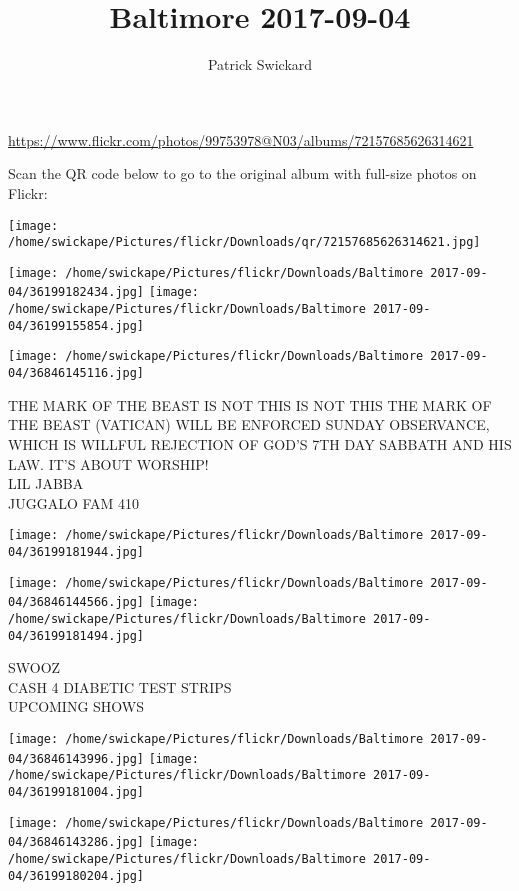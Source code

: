 \documentclass[10pt,letterpaper]{article}
\title{Baltimore 2017-09-04}
\author{Patrick Swickard}
\date{}
\begin{document}
\maketitle

\url{https://www.flickr.com/photos/99753978@N03/albums/72157685626314621}

Scan the QR code below to go to the original album with full-size photos on Flickr:

\texttt{[image: /home/swickape/Pictures/flickr/Downloads/qr/72157685626314621.jpg]}
\pagebreak

\texttt{[image: /home/swickape/Pictures/flickr/Downloads/Baltimore 2017-09-04/36199182434.jpg]}
\texttt{[image: /home/swickape/Pictures/flickr/Downloads/Baltimore 2017-09-04/36199155854.jpg]}

\vspace{0.25in}
\texttt{[image: /home/swickape/Pictures/flickr/Downloads/Baltimore 2017-09-04/36846145116.jpg]}

THE MARK OF THE BEAST IS NOT THIS IS NOT THIS THE MARK OF THE BEAST (VATICAN) WILL BE ENFORCED SUNDAY OBSERVANCE, WHICH IS WILLFUL REJECTION OF GOD'S 7TH DAY SABBATH AND HIS LAW.  IT'S ABOUT WORSHIP!\\
LIL JABBA\\
JUGGALO FAM 410
\pagebreak

\texttt{[image: /home/swickape/Pictures/flickr/Downloads/Baltimore 2017-09-04/36199181944.jpg]}

\vspace{0.25in}
\texttt{[image: /home/swickape/Pictures/flickr/Downloads/Baltimore 2017-09-04/36846144566.jpg]}
\texttt{[image: /home/swickape/Pictures/flickr/Downloads/Baltimore 2017-09-04/36199181494.jpg]}

SWOOZ\\
CASH 4 DIABETIC TEST STRIPS\\
UPCOMING SHOWS
\pagebreak

\texttt{[image: /home/swickape/Pictures/flickr/Downloads/Baltimore 2017-09-04/36846143996.jpg]}
\texttt{[image: /home/swickape/Pictures/flickr/Downloads/Baltimore 2017-09-04/36199181004.jpg]}

\texttt{[image: /home/swickape/Pictures/flickr/Downloads/Baltimore 2017-09-04/36846143286.jpg]}
\texttt{[image: /home/swickape/Pictures/flickr/Downloads/Baltimore 2017-09-04/36199180204.jpg]}
\end{document}

